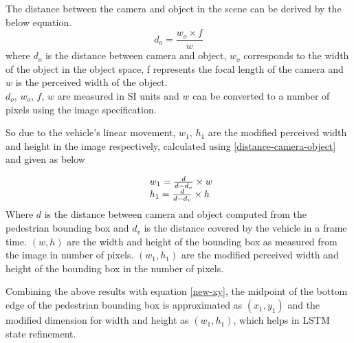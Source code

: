 


The distance between the camera and object in the scene can be derived by the below equation.
\begin{equation} \label{distance-camera-object}
d_o = \frac{w_o \times f}{w}
\end{equation}
where $d_o$ is the distance between camera and object, $w_o$ corresponds to the width of the object in the object space, f represents the focal length of the camera and $w$ is the perceived width of the object. \\
$d_o$, $w_o$, $f$, $w$ are measured in SI units and $w$ can be converted to a number of pixels using the image specification.

So due to the vehicle's linear movement, ${w_1}$, ${h_1}$ are the modified perceived width and height in the image respectively, calculated using \ref{distance-camera-object} and given as below

\begin{equation}
\begin{array}{l@{}} 
{w_1} = \frac{d}{d-d_v} \times w \\
{h_1} = \frac{d}{d-d_v} \times h
\end{array}
\end{equation}
Where $d$ is the distance between camera and object computed from the pedestrian bounding box and $d_v$ is the distance covered by the vehicle in a frame time. $(w,h)$ are the width and height of the bounding box as measured from the image in number of pixels. $(w_1,h_1)$ are the modified perceived width and height of the bounding box in the number of pixels.

Combining the above results with equation \ref{new-xy}, the midpoint of the bottom edge of the pedestrian bounding box is approximated as $({x_1}, {y_1})$ and the modified dimension for width and height as $({w_1}, {h_1})$, which helps in LSTM state refinement.

